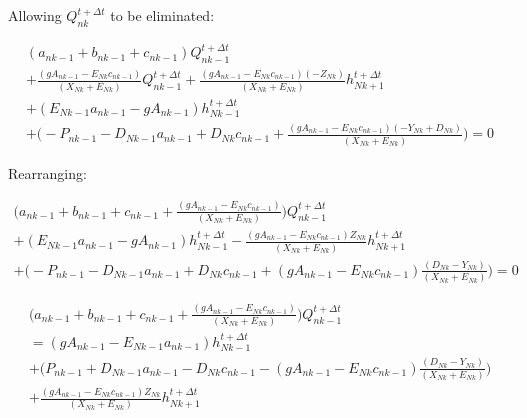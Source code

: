 \documentclass[11pt]{article}
\begin{document}
Allowing $Q_{nk}^{t + \Delta t}$ to be eliminated:

\begin{equation}
  \begin{split}
    (a_{nk - 1} + b_{nk - 1} + c_{nk - 1})  Q_{nk - 1}^{t + \Delta t} \\ + \frac{( g A_{nk - 1} - E_{Nk} c_{nk - 1} )}{(X_{Nk} + E_{Nk})} Q_{nk - 1}^{t + \Delta t} + \frac{( g A_{nk - 1} - E_{Nk} c_{nk - 1} ) (-Z_{Nk})}{(X_{Nk} + E_{Nk})} h_{Nk + 1}^{t + \Delta t} \\ + (E_{Nk - 1} a_{nk - 1} - g A_{nk -1}) h_{Nk - 1}^{t + \Delta t}   
   \\ + \biggl( - P_{nk - 1} - D_{Nk - 1} a_{nk - 1}   + D_{Nk} c_{nk - 1} + \frac{( g A_{nk - 1} - E_{Nk} c_{nk - 1} )(-Y_{Nk} + D_{Nk})}{(X_{Nk} + E_{Nk})} \biggr) = 0 
  \end{split}
\end{equation}

Rearranging:

\begin{equation}
  \begin{split}
    \biggl(a_{nk - 1} + b_{nk - 1} + c_{nk - 1} + \frac{( g A_{nk - 1} - E_{Nk} c_{nk - 1} )}{(X_{Nk} + E_{Nk})} \biggr)  Q_{nk - 1}^{t + \Delta t} \\ + (E_{Nk - 1} a_{nk - 1} - g A_{nk -1}) h_{Nk - 1}^{t + \Delta t} - \frac{( g A_{nk - 1} - E_{Nk} c_{nk - 1} ) Z_{Nk}}{(X_{Nk} + E_{Nk})} h_{Nk + 1}^{t + \Delta t}  
   \\ + \biggl( - P_{nk - 1} - D_{Nk - 1} a_{nk - 1}   + D_{Nk} c_{nk - 1} + ( g A_{nk - 1} - E_{Nk} c_{nk - 1} ) \frac{( D_{Nk} - Y_{Nk})}{(X_{Nk} + E_{Nk})} \biggr) = 0 
  \end{split}
\end{equation}

\begin{equation}
  \begin{split}
    \biggl(a_{nk - 1} + b_{nk - 1} + c_{nk - 1} + \frac{( g A_{nk - 1} - E_{Nk} c_{nk - 1} )}{(X_{Nk} + E_{Nk})} \biggr)  Q_{nk - 1}^{t + \Delta t} \\ = ( g A_{nk -1} - E_{Nk - 1} a_{nk - 1}) h_{Nk - 1}^{t + \Delta t} \\ + \biggl( P_{nk - 1} + D_{Nk - 1} a_{nk - 1}   - D_{Nk} c_{nk - 1} - ( g A_{nk - 1} - E_{Nk} c_{nk - 1} ) \frac{( D_{Nk} - Y_{Nk})}{(X_{Nk} + E_{Nk})} \biggr) \\ + \frac{( g A_{nk - 1} - E_{Nk} c_{nk - 1} ) Z_{Nk}}{(X_{Nk} + E_{Nk})} h_{Nk + 1}^{t + \Delta t}
  \end{split}
\end{equation}
\end{document}
